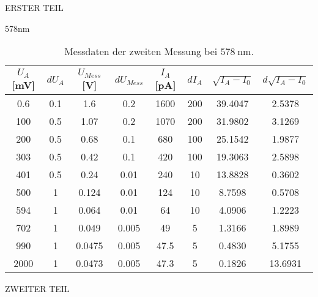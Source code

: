 \begin{appendix}
\begin{chapter}{ERSTER TEIL}
\begin{section}{578nm}
        \begin{table}[htbp]
          \centering
          \scriptsize
          \begin{tabular}{|c|c|c|c|c|c|c|c|}
            \hline
            $U_{A}$ [mV] & $dU_{A}$ & $U_{Mess}$ [V] & $dU_{Mess}$ & 
                $I_{A}$ [pA] & $dI_{A}$ & $\sqrt{I_{A}-I_0}$ & 
                $d\sqrt{I_{A}-I_0}$ \\ \hline
            0.6 & 0.1 & 1.6 & 0.2 & 1600 & 200 & 39.4047 & 2.5378 \\ \hline
          100 & 0.5 & 1.07 & 0.2 & 1070 & 200 & 31.9802 & 3.1269 \\ \hline
          200 & 0.5 & 0.68 & 0.1 & 680 & 100 & 25.1542 & 1.9877 \\ \hline
          303 & 0.5 & 0.42 & 0.1 & 420 & 100 & 19.3063 & 2.5898 \\ \hline
          401 & 0.5 & 0.24 & 0.01 & 240 & 10 & 13.8828 & 0.3602 \\ \hline
          500 & 1 & 0.124 & 0.01 & 124 & 10 & 8.7598 & 0.5708 \\ \hline
          594 & 1 & 0.064 & 0.01 & 64 & 10 & 4.0906 & 1.2223 \\ \hline
          702 & 1 & 0.049 & 0.005 & 49 & 5 & 1.3166 & 1.8989 \\ \hline
          990 & 1 & 0.0475 & 0.005 & 47.5 & 5 & 0.4830 & 5.1755 \\ \hline
          2000 & 1 & 0.0473 & 0.005 & 47.3 & 5 & 0.1826 & 13.6931 \\ \hline
          \end{tabular}
          \caption{Messdaten der zweiten Messung bei $\SI{578}{\nano\meter}$.}
          \label{tab:578_2}
        \end{table}
        
      \end{section}
     
    \end{chapter}
    
    
    
    \begin{chapter}{ZWEITER TEIL}
      \label{Anhang:chp:ZWEITERTEIL}
     
     
     

\end{chapter}
\end{appendix}

